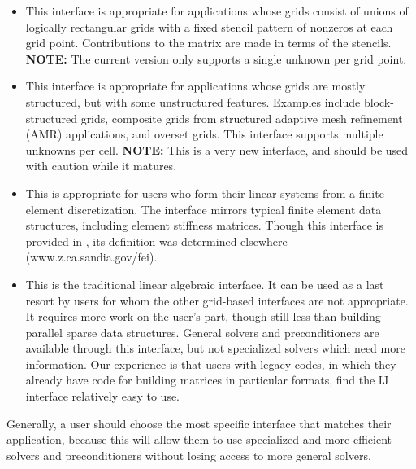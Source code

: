 \begin{itemize}

\item
{}
This interface is appropriate for applications whose grids consist of
unions of logically rectangular grids with a fixed stencil pattern of
nonzeros at each grid point.  Contributions to the matrix are made in
terms of the stencils.  {\bf NOTE:} The current version only supports
a single unknown per grid point.

\item
{}
This interface is appropriate for applications whose grids are mostly
structured, but with some unstructured features.  Examples include
block-structured grids, composite grids from structured adaptive mesh
refinement (AMR) applications, and overset grids.  This interface
supports multiple unknowns per cell.  {\bf NOTE:} This is a very new
interface, and should be used with caution while it matures.

\item
{}
This is appropriate for users who form their linear systems from a
finite element discretization.  The interface mirrors typical finite
element data structures, including element stiffness matrices.  Though
this interface is provided in \hypre{}, its definition was determined
elsewhere (www.z.ca.sandia.gov/fei).

\item
{}
This is the traditional linear algebraic interface.  It can be used as
a last resort by users for whom the other grid-based interfaces are
not appropriate.  It requires more work on the user's part, though
still less than building parallel sparse data structures.  General
solvers and preconditioners are available through this interface, but
not specialized solvers which need more information.  Our experience
is that users with legacy codes, in which they already have code for
building matrices in particular formats, find the IJ interface
relatively easy to use.

\end{itemize}

Generally, a user should choose the most specific interface that
matches their application, because this will allow them to use
specialized and more efficient solvers and preconditioners without
losing access to more general solvers.


